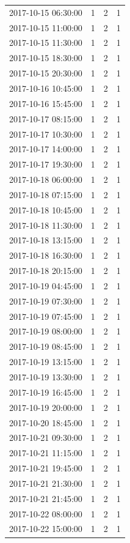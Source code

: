 \begin{tabular}{lrrr}
2017-10-15 06:30:00 & 1 & 2 & 1 \\
2017-10-15 11:00:00 & 1 & 2 & 1 \\
2017-10-15 11:30:00 & 1 & 2 & 1 \\
2017-10-15 18:30:00 & 1 & 2 & 1 \\
2017-10-15 20:30:00 & 1 & 2 & 1 \\
2017-10-16 10:45:00 & 1 & 2 & 1 \\
2017-10-16 15:45:00 & 1 & 2 & 1 \\
2017-10-17 08:15:00 & 1 & 2 & 1 \\
2017-10-17 10:30:00 & 1 & 2 & 1 \\
2017-10-17 14:00:00 & 1 & 2 & 1 \\
2017-10-17 19:30:00 & 1 & 2 & 1 \\
2017-10-18 06:00:00 & 1 & 2 & 1 \\
2017-10-18 07:15:00 & 1 & 2 & 1 \\
2017-10-18 10:45:00 & 1 & 2 & 1 \\
2017-10-18 11:30:00 & 1 & 2 & 1 \\
2017-10-18 13:15:00 & 1 & 2 & 1 \\
2017-10-18 16:30:00 & 1 & 2 & 1 \\
2017-10-18 20:15:00 & 1 & 2 & 1 \\
2017-10-19 04:45:00 & 1 & 2 & 1 \\
2017-10-19 07:30:00 & 1 & 2 & 1 \\
2017-10-19 07:45:00 & 1 & 2 & 1 \\
2017-10-19 08:00:00 & 1 & 2 & 1 \\
2017-10-19 08:45:00 & 1 & 2 & 1 \\
2017-10-19 13:15:00 & 1 & 2 & 1 \\
2017-10-19 13:30:00 & 1 & 2 & 1 \\
2017-10-19 16:45:00 & 1 & 2 & 1 \\
2017-10-19 20:00:00 & 1 & 2 & 1 \\
2017-10-20 18:45:00 & 1 & 2 & 1 \\
2017-10-21 09:30:00 & 1 & 2 & 1 \\
2017-10-21 11:15:00 & 1 & 2 & 1 \\
2017-10-21 19:45:00 & 1 & 2 & 1 \\
2017-10-21 21:30:00 & 1 & 2 & 1 \\
2017-10-21 21:45:00 & 1 & 2 & 1 \\
2017-10-22 08:00:00 & 1 & 2 & 1 \\
2017-10-22 15:00:00 & 1 & 2 & 1 \\

\end{tabular}
